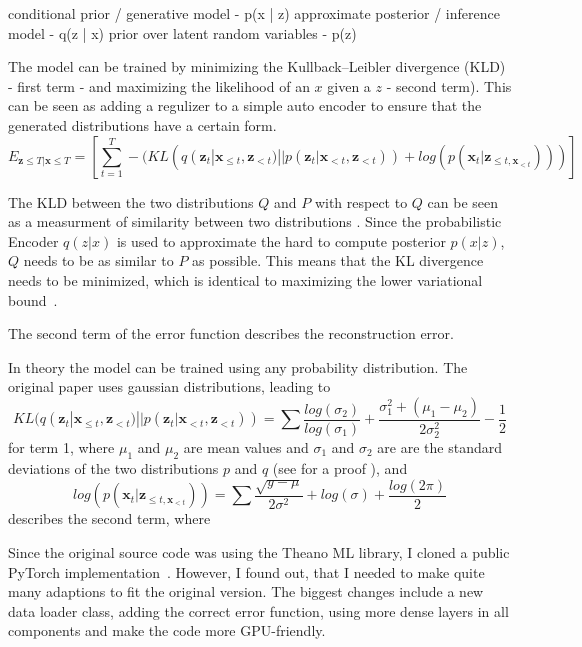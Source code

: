 \documentclass[12pt]{article}
\begin{document}

conditional prior / generative model - p(x | z)
approximate posterior / inference model - q(z | x)
prior over latent random variables - p(z)


The model can be trained by minimizing the Kullback–Leibler divergence (KLD) - first term - and maximizing the likelihood of an $x$ given a $z$ - second term).
This can be seen as adding a regulizer to a simple auto encoder to ensure that the generated distributions have a certain form.
$$
E_{\mathbf{z} \le T | \mathbf{x} \le T} = \left[ \sum_{t=1}^T -(KL(q(\mathbf{z}_t | \mathbf{x}_{\le t}, \mathbf{z}_{<t}) || p(\mathbf{z}_t | \mathbf{x}_{<t}, \mathbf{z}_{<t})) + log(p(\mathbf{x}_t | \mathbf{z}_{\le t, \mathbf{x}_{<t}}))) \right]
$$

The KLD between the two distributions $Q$ and $P$ with respect to $Q$ can be seen as a measurment of similarity between two distributions \cite{}.
Since the probabilistic Encoder $q(z|x)$ is used to approximate the hard to compute posterior $p(x|z)$, $Q$ needs to be as similar to $P$ as possible.
This means that the KL divergence needs to be minimized, which is identical to maximizing the lower variational bound~\cite{kingma2013auto}. 

The second term of the error function describes the reconstruction error.

In theory the model can be trained using any probability distribution.
The original paper uses gaussian distributions, leading to
$$
KL(q(\mathbf{z}_t | \mathbf{x}_{\le t}, \mathbf{z}_{<t}) || p(\mathbf{z}_t | \mathbf{x}_{<t}, \mathbf{z}_{<t}))
= \sum \frac{log(\sigma_2)}{log(\sigma_1)}+\frac{\sigma_1^2 + (\mu_1 - \mu_2)}{2 \sigma_2^2} - \frac{1}{2}
$$
for term 1, where $\mu_1$ and $\mu_2$ are mean values and $\sigma_1$ and $\sigma_2$ are are the standard deviations of the two distributions $p$ and $q$ (see \cite{klproof} for a proof ), and
$$
log(p(\mathbf{x}_t | \mathbf{z}_{\le t, \mathbf{x}_{<t}}))
= \sum \frac{\sqrt{y-\mu}}{2 \sigma^2} + log(\sigma) + \frac{log(2\pi)}{2}
$$
describes the second term, where %


Since the original source code was using the Theano ML library, I cloned a public PyTorch implementation~\cite{VRNNgit}.
However, I found out, that I needed to make quite many adaptions to fit the original version.
The biggest changes include a new data loader class, adding the correct error function, using more dense layers in all components and make the code more GPU-friendly. 
\end{document}
